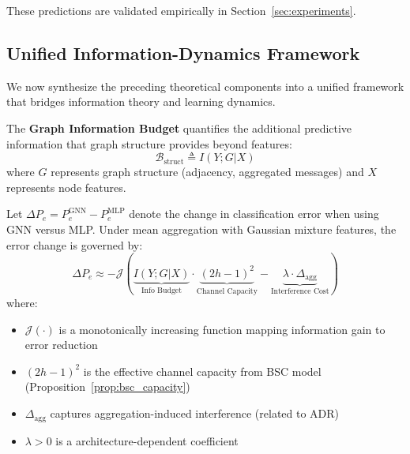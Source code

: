 These predictions are validated empirically in Section~\ref{sec:experiments}.

\subsection{Unified Information-Dynamics Framework}

We now synthesize the preceding theoretical components into a unified framework that bridges information theory and learning dynamics.

\begin{definition}
\label{def:graph_info_budget}
The \textbf{Graph Information Budget} quantifies the additional predictive information that graph structure provides beyond features:
\begin{equation}
    \mathcal{B}_{\text{struct}} \triangleq I(Y; G | X)
\end{equation}
where $G$ represents graph structure (adjacency, aggregated messages) and $X$ represents node features.
\end{definition}

\begin{theorem}
\label{thm:unified_bound}
Let $\Delta P_e = P_e^{\text{GNN}} - P_e^{\text{MLP}}$ denote the change in classification error when using GNN versus MLP. Under mean aggregation with Gaussian mixture features, the error change is governed by:
\begin{equation}
    \Delta P_e \approx -\mathcal{J}\left( \underbrace{I(Y; G | X)}_{\text{Info Budget}} \cdot \underbrace{(2h-1)^2}_{\text{Channel Capacity}} - \underbrace{\lambda \cdot \Delta_{\text{agg}}}_{\text{Interference Cost}} \right)
\end{equation}
where:
\begin{itemize}
    \item $\mathcal{J}(\cdot)$ is a monotonically increasing function mapping information gain to error reduction
    \item $(2h-1)^2$ is the effective channel capacity from BSC model (Proposition~\ref{prop:bsc_capacity})
    \item $\Delta_{\text{agg}}$ captures aggregation-induced interference (related to ADR)
    \item $\lambda > 0$ is a architecture-dependent coefficient
\end{itemize}
\end{theorem}

